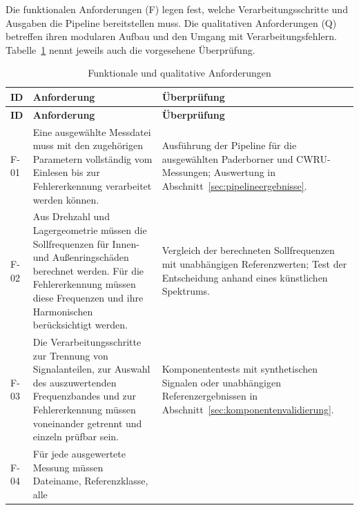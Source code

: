 
Die funktionalen Anforderungen (F) legen fest, welche Verarbeitungsschritte
und Ausgaben die Pipeline bereitstellen muss. Die qualitativen Anforderungen
(Q) betreffen ihren modularen Aufbau und den Umgang mit Verarbeitungsfehlern.
Tabelle~\ref{tab:anforderungen_funktional} nennt jeweils auch die vorgesehene
Überprüfung.

\begingroup
\small
\setlength{\aboverulesep}{0pt}
\setlength{\belowrulesep}{0pt}
\setlength{\doublerulesep}{0pt}
\renewcommand{\arraystretch}{1.2}
\begin{longtable}{|
    >{\raggedright\arraybackslash}p{1.0cm}|
    >{\raggedright\arraybackslash}p{8.0cm}|
    >{\raggedright\arraybackslash}p{\dimexpr\textwidth-9.0cm-6\tabcolsep-4\arrayrulewidth\relax}|}
  \caption{Funktionale und qualitative Anforderungen}
  \label{tab:anforderungen_funktional} \\
    \hline
    \textbf{ID} & \textbf{Anforderung} & \textbf{Überprüfung} \\
    \toprule
    \toprule
    \endfirsthead
    \hline
    \textbf{ID} & \textbf{Anforderung} & \textbf{Überprüfung} \\
    \toprule
    \toprule
    \endhead
    \leavevmode\hypertarget{req:F-01}{F-01} & Eine ausgewählte Messdatei muss mit den zugehörigen Parametern
    vollständig vom Einlesen bis zur Fehlererkennung verarbeitet werden
    können. & Ausführung der Pipeline für die ausgewählten Paderborner und
    CWRU-Messungen; Auswertung in Abschnitt~\ref{sec:pipelineergebnisse}. \\
    \hline
    \leavevmode\hypertarget{req:F-02}{F-02} & Aus Drehzahl und Lagergeometrie müssen die Sollfrequenzen für Innen-
    und Außenringschäden berechnet werden. Für die Fehlererkennung müssen diese
    Frequenzen und ihre Harmonischen berücksichtigt werden. & Vergleich der
    berechneten Sollfrequenzen mit unabhängigen Referenzwerten; Test der
    Entscheidung anhand eines künstlichen Spektrums. \\
    \hline
    \leavevmode\hypertarget{req:F-03}{F-03} & Die Verarbeitungsschritte zur Trennung von Signalanteilen, zur
    Auswahl des auszuwertenden Frequenzbandes und zur Fehlererkennung müssen
    voneinander getrennt und einzeln prüfbar sein. & Komponententests mit
    synthetischen Signalen oder unabhängigen Referenzergebnissen in
    Abschnitt~\ref{sec:komponentenvalidierung}. \\
    \hline
    \leavevmode\hypertarget{req:F-04}{F-04} & Für jede ausgewertete Messung müssen Dateiname, Referenzklasse, alle

\end{longtable}
